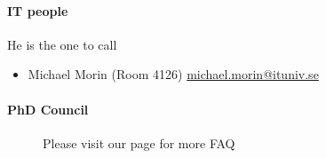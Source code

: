 \documentclass[acmtog]{acmart}
\begin{document}
\paragraph{IT people}
He is the one to call
\begin{itemize}
\item Michael Morin (Room 4126) \url{michael.morin@ituniv.se}
\end{itemize}
\paragraph{PhD Council}


\begin{figure}
  \begin{center}
    \caption{Please visit our page for more FAQ}
    \end{center}
\end{figure}




\end{document}
